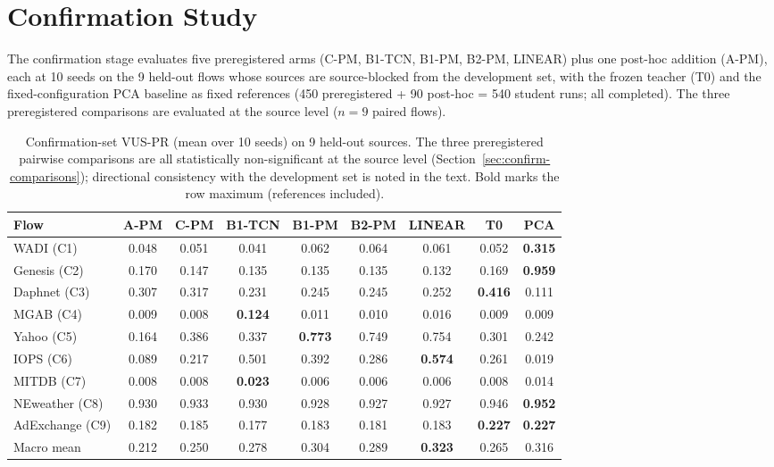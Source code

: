 \section{Confirmation Study}\label{sec:confirm}

The confirmation stage evaluates five preregistered arms (C-PM, B1-TCN,
B1-PM, B2-PM, LINEAR) plus one post-hoc addition (A-PM), each at 10
seeds on the 9 held-out flows
whose sources are source-blocked from the development set, with the frozen
teacher (T0) and the fixed-configuration PCA baseline as fixed references
(450 preregistered + 90 post-hoc = 540 student runs; all completed). The three preregistered comparisons are
evaluated at the source level ($n{=}9$ paired flows).

\begin{table}[t]
\centering
\caption{Confirmation-set VUS-PR (mean over 10 seeds) on 9 held-out
sources. The three preregistered pairwise comparisons are all
statistically non-significant at the source level (Section~\ref{sec:confirm-comparisons});
directional consistency with the development set is
noted in the text. Bold marks the row maximum (references included).}
\label{tab:confirm}
\scriptsize
\setlength{\tabcolsep}{3pt}
\begin{tabular}{lcccccccc}
\toprule
Flow & A-PM & C-PM & B1-TCN & B1-PM & B2-PM & LINEAR & T0 & PCA \\
\midrule
WADI (C1)            & 0.048 & 0.051 & 0.041 & 0.062 & 0.064 & 0.061 & 0.052 & \textbf{0.315} \\
Genesis (C2)         & 0.170 & 0.147 & 0.135 & 0.135 & 0.135 & 0.132 & 0.169 & \textbf{0.959} \\
Daphnet (C3)         & 0.307 & 0.317 & 0.231 & 0.245 & 0.245 & 0.252 & \textbf{0.416} & 0.111 \\
MGAB (C4)            & 0.009 & 0.008 & \textbf{0.124} & 0.011 & 0.010 & 0.016 & 0.009 & 0.009 \\
Yahoo (C5)           & 0.164 & 0.386 & 0.337 & \textbf{0.773} & 0.749 & 0.754 & 0.301 & 0.242 \\
IOPS (C6)            & 0.089 & 0.217 & 0.501 & 0.392 & 0.286 & \textbf{0.574} & 0.261 & 0.019 \\
MITDB (C7)           & 0.008 & 0.008 & \textbf{0.023} & 0.006 & 0.006 & 0.006 & 0.008 & 0.014 \\
NEweather (C8)       & 0.930 & 0.933 & 0.930 & 0.928 & 0.927 & 0.927 & 0.946 & \textbf{0.952} \\
AdExchange (C9)      & 0.182 & 0.185 & 0.177 & 0.183 & 0.181 & 0.183 & \textbf{0.227} & \textbf{0.227} \\
\midrule
Macro mean           & 0.212 & 0.250 & 0.278 & 0.304 & 0.289 & \textbf{0.323} & 0.265 & 0.316 \\
\bottomrule
\end{tabular}
\end{table}

